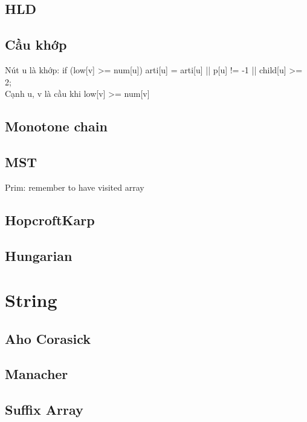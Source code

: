 \documentclass[A4 paper, 12pt, oneside]{article}
\begin{document}
\begin{landscape}
\begin{multicols}{2}
	\subsection{HLD}
	
	
	\subsection{Cầu khớp}
Nút u là khớp: 
if (low[v] >= num[u]) arti[u] = arti[u] || p[u] != -1 || child[u] >= 2;\\
Cạnh u, v là cầu khi low[v] >= num[v]
	\subsection{Monotone chain}
	

	\subsection{MST}
	Prim: remember to have visited array
	
	\subsection{HopcroftKarp}
	
	
	\subsection{Hungarian}
	
	
\section{String}
	\subsection{Aho Corasick}
	
	
	\subsection{Manacher}
	
	
	\subsection{Suffix Array}
	
	

\end{multicols}
\end{landscape}
\end{document}
